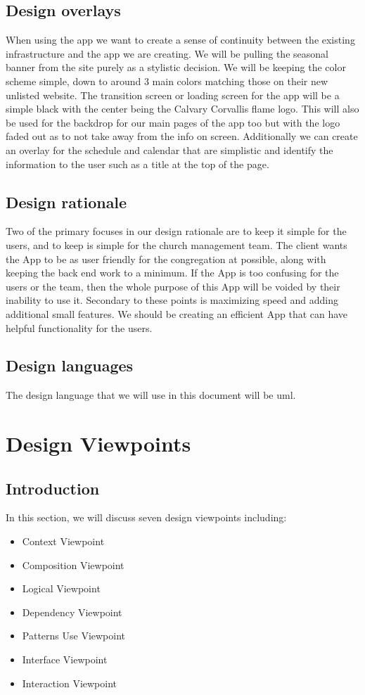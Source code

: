 \documentclass[letterpaper,10pt,draftclsnofoot,onecolumn,titlepage]{IEEEtran}
\begin{document}
		\subsection{Design overlays}
		When using the app we want to create a sense of continuity between the existing infrastructure and the app we are creating.
		We will be pulling the seasonal banner from the site purely as a stylistic decision.
		We will be keeping the color scheme simple, down to around 3 main colors matching those on their new unlisted website.
		The transition screen or loading screen for the app will be a simple black with the center being the Calvary Corvallis flame logo.
		This will also be used for the backdrop for our main pages of the app too but with the logo faded out as to not take away from the info on screen.
		Additionally we can create an overlay for the schedule and calendar that are simplistic and identify the information to the user such as a title at the top of the page.

		\subsection{Design rationale}
		Two of the primary focuses in our design rationale are to keep it simple for the users, and to keep is simple for the church management team.
		The client wants the \gls{App} to be as user friendly for the congregation at possible, along with keeping the back end work to a minimum.
		If the \gls{App} is too confusing for the users or the team, then the whole purpose of this \gls{App} will be voided by their inability to use it.
		Secondary to these points is maximizing speed and adding additional small features.
		We should be creating an efficient \gls{App} that can have helpful functionality for the users.

		\subsection{Design languages}
		The design language that we will use in this document will be \gls{uml}.

	\section{Design Viewpoints}

		\subsection{Introduction}
		In this section, we will discuss seven design viewpoints including:
			\begin{itemize}
				\item{Context Viewpoint}
				\item{Composition Viewpoint}
				\item{Logical Viewpoint}
				\item{Dependency Viewpoint}
				\item{Patterns Use Viewpoint}
				\item{Interface Viewpoint}
				\item{Interaction Viewpoint}
			\end{itemize}
\end{document}
